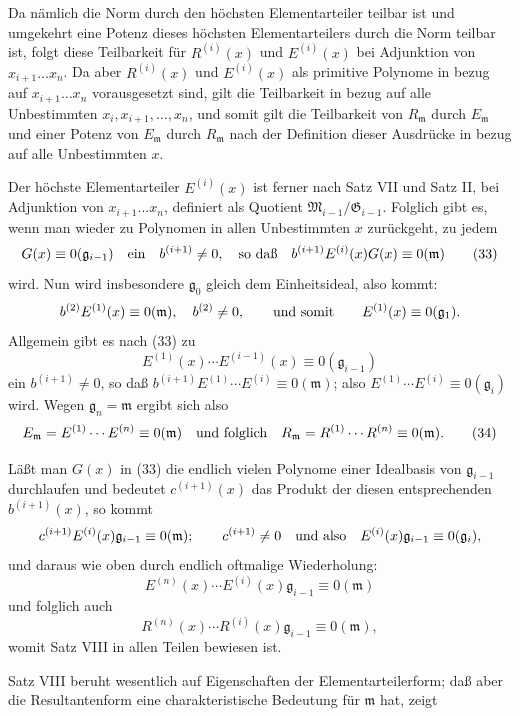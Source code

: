 \documentclass[11pt]{article}
\providecommand{\Gmod}{\mathfrak G}
\providecommand{\Mmod}{\mathfrak M}
\providecommand{\mideal}{\mathfrak m}
\providecommand{\gideal}{\mathfrak g}
\begin{document}
Da nämlich die Norm durch den höchsten Elementarteiler teilbar ist und umgekehrt eine Potenz dieses höchsten Elementarteilers durch die Norm teilbar ist, folgt diese Teilbarkeit für $R^{(i)}(x)$ und $E^{(i)}(x)$ bei Adjunktion von $x_{i+1}\ldots x_n$. Da aber $R^{(i)}(x)$ und $E^{(i)}(x)$ als primitive Polynome in bezug auf $x_{i+1}\ldots x_n$ vorausgesetzt sind, gilt die Teilbarkeit in bezug auf alle Unbestimmten $x_i,x_{i+1},\ldots,x_n$, und somit gilt die Teilbarkeit von $R_\mideal$ durch $E_\mideal$ und einer Potenz von $E_\mideal$ durch $R_\mideal$ nach der Definition dieser Ausdrücke in bezug auf alle Unbestimmten $x$.

Der höchste Elementarteiler $E^{(i)}(x)$ ist ferner nach Satz VII und Satz II, bei Adjunktion von $x_{i+1}\ldots x_n$, definiert als Quotient $\Mmod_{i-1}/\Gmod_{i-1}$. Folglich gibt es, wenn man wieder zu Polynomen in allen Unbestimmten $x$ zurückgeht, zu jedem
\begin{equation}
 G(x)\equiv0(\gideal_{i-1})
 \quad\hbox{ein}\quad b^{(i+1)}\ne0,
 \quad\hbox{so daß}\quad b^{(i+1)}E^{(i)}(x)G(x)\equiv0(\mideal)
\tag{33}
\end{equation}
wird. Nun wird insbesondere $\gideal_0$ gleich dem Einheitsideal, also kommt:
\[
 b^{(2)}E^{(1)}(x)\equiv0(\mideal),\quad b^{(2)}\ne0,
 \qquad\hbox{und somit}\qquad E^{(1)}(x)\equiv0(\gideal_1).
\]
Allgemein gibt es nach (33) zu
\[
 E^{(1)}(x)\cdots E^{(i-1)}(x)\equiv0(\gideal_{i-1})
\]
ein $b^{(i+1)}\ne0$, so daß $b^{(i+1)}E^{(1)}\cdots E^{(i)}\equiv0(\mideal)$; also $E^{(1)}\cdots E^{(i)}\equiv0(\gideal_i)$ wird. Wegen $\gideal_n=\mideal$ ergibt sich also
\begin{equation}
 E_\mideal=E^{(1)}\cdots E^{(n)}\equiv0(\mideal)
 \quad\hbox{und folglich}\quad
 R_\mideal=R^{(1)}\cdots R^{(n)}\equiv0(\mideal).
\tag{34}
\end{equation}

Läßt man $G(x)$ in (33) die endlich vielen Polynome einer Idealbasis von $\gideal_{i-1}$ durchlaufen und bedeutet $c^{(i+1)}(x)$ das Produkt der diesen entsprechenden $b^{(i+1)}(x)$, so kommt
\[
 c^{(i+1)}E^{(i)}(x)\gideal_{i-1}\equiv0(\mideal);
 \qquad c^{(i+1)}\ne0
 \quad\hbox{und also}\quad E^{(i)}(x)\gideal_{i-1}\equiv0(\gideal_i),
\]
und daraus wie oben durch endlich oftmalige Wiederholung:
\[
 E^{(n)}(x)\cdots E^{(i)}(x)\gideal_{i-1}\equiv0(\mideal)
\]
und folglich auch
\[
 R^{(n)}(x)\cdots R^{(i)}(x)\gideal_{i-1}\equiv0(\mideal),
\]
womit Satz VIII in allen Teilen bewiesen ist.

Satz VIII beruht wesentlich auf Eigenschaften der Elementarteilerform; daß aber die Resultantenform eine charakteristische Bedeutung für $\mideal$ hat, zeigt
\end{document}

